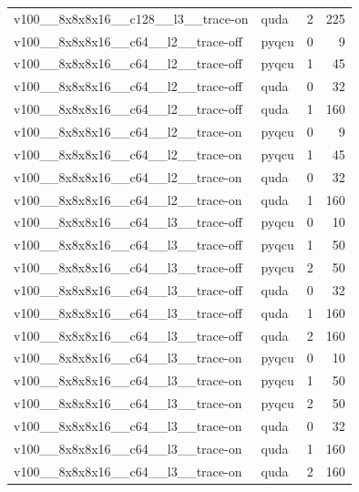 \begin{table}[htbp]
\begin{tabular}{@{}llrr@{}}
v100\_\_8x8x8x16\_\_c128\_\_l3\_\_trace-on & quda & 2 & 225 \\
v100\_\_8x8x8x16\_\_c64\_\_l2\_\_trace-off & pyqcu & 0 & 9 \\
v100\_\_8x8x8x16\_\_c64\_\_l2\_\_trace-off & pyqcu & 1 & 45 \\
v100\_\_8x8x8x16\_\_c64\_\_l2\_\_trace-off & quda & 0 & 32 \\
v100\_\_8x8x8x16\_\_c64\_\_l2\_\_trace-off & quda & 1 & 160 \\
v100\_\_8x8x8x16\_\_c64\_\_l2\_\_trace-on & pyqcu & 0 & 9 \\
v100\_\_8x8x8x16\_\_c64\_\_l2\_\_trace-on & pyqcu & 1 & 45 \\
v100\_\_8x8x8x16\_\_c64\_\_l2\_\_trace-on & quda & 0 & 32 \\
v100\_\_8x8x8x16\_\_c64\_\_l2\_\_trace-on & quda & 1 & 160 \\
v100\_\_8x8x8x16\_\_c64\_\_l3\_\_trace-off & pyqcu & 0 & 10 \\
v100\_\_8x8x8x16\_\_c64\_\_l3\_\_trace-off & pyqcu & 1 & 50 \\
v100\_\_8x8x8x16\_\_c64\_\_l3\_\_trace-off & pyqcu & 2 & 50 \\
v100\_\_8x8x8x16\_\_c64\_\_l3\_\_trace-off & quda & 0 & 32 \\
v100\_\_8x8x8x16\_\_c64\_\_l3\_\_trace-off & quda & 1 & 160 \\
v100\_\_8x8x8x16\_\_c64\_\_l3\_\_trace-off & quda & 2 & 160 \\
v100\_\_8x8x8x16\_\_c64\_\_l3\_\_trace-on & pyqcu & 0 & 10 \\
v100\_\_8x8x8x16\_\_c64\_\_l3\_\_trace-on & pyqcu & 1 & 50 \\
v100\_\_8x8x8x16\_\_c64\_\_l3\_\_trace-on & pyqcu & 2 & 50 \\
v100\_\_8x8x8x16\_\_c64\_\_l3\_\_trace-on & quda & 0 & 32 \\
v100\_\_8x8x8x16\_\_c64\_\_l3\_\_trace-on & quda & 1 & 160 \\
v100\_\_8x8x8x16\_\_c64\_\_l3\_\_trace-on & quda & 2 & 160 \\
\bottomrule
\end{tabular}
\end{table}

